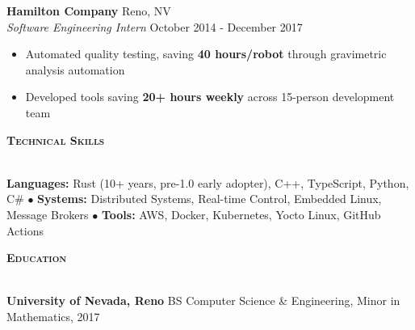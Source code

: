 \documentclass[a4paper]{article}
\newcommand{\lineunder} {
    \vspace*{-8pt} \\
    \hspace*{-18pt} \hrulefill \\
}
\newcommand{\header} [1] {
    {\hspace*{-18pt}\vspace*{6pt} \large \textbf{\textsc{#1}}}
    \vspace*{-6pt} \lineunder
    \vspace*{4pt}
}
\begin{document}
\textbf{Hamilton Company} \hfill Reno, NV\\
\textit{Software Engineering Intern} \hfill October 2014 - December 2017\\
\vspace{-1mm}
\begin{itemize} \itemsep 1pt
    \item Automated quality testing, saving \textbf{40 hours/robot} through gravimetric analysis automation
    \item Developed tools saving \textbf{20+ hours weekly} across 15-person development team
\end{itemize}

\header{Technical Skills}
\textbf{Languages:} Rust (10+ years, pre-1.0 early adopter), C++, TypeScript, Python, C\# $\bullet$ \textbf{Systems:} Distributed Systems, Real-time Control, Embedded Linux, Message Brokers $\bullet$ \textbf{Tools:} AWS, Docker, Kubernetes, Yocto Linux, GitHub Actions

\header{Education}
\textbf{University of Nevada, Reno} \hfill BS Computer Science \& Engineering, Minor in Mathematics, 2017
\end{document}
